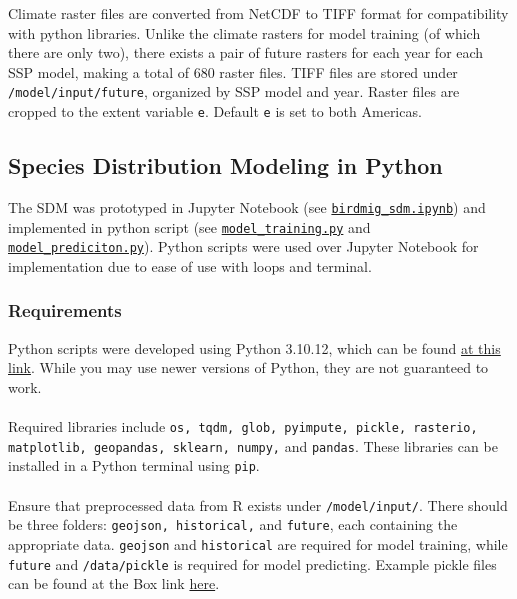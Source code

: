 \documentclass{article}
\begin{document}
Climate raster files are converted from NetCDF to TIFF format for compatibility with python libraries.
Unlike the climate rasters for model training (of which there are only two), there exists a pair of future rasters for each year for each SSP model, making a total of 680 raster files. 
TIFF files are stored under \texttt{/model/input/future}, organized by SSP model and year.
Raster files are cropped to the extent variable \texttt{e}. Default \texttt{e} is set to both Americas.

\subsection{Species Distribution Modeling in Python}

The SDM was prototyped in Jupyter Notebook (see \texttt{\href{run:../model/birdmig\_sdm.ipynb}{birdmig\_sdm.ipynb}}) and implemented in python script (see \texttt{\href{run:../model/model\_training.py}{model\_training.py}} and \texttt{\href{run:../model/model\_prediction.py}{model\_prediciton.py}}). Python scripts were used over Jupyter Notebook for implementation due to ease of use with loops and terminal.

\subsubsection*{Requirements}
Python scripts were developed using Python 3.10.12, which can be found \href{https://www.python.org/downloads/}{at this link}. While you may use newer versions of Python, they are not guaranteed to work.
\\\\
Required libraries include \texttt{os, tqdm, glob, pyimpute, pickle, rasterio, matplotlib, geopandas, sklearn, numpy,} and \texttt{pandas}. These libraries can be installed in a Python terminal using \texttt{pip}.
\\\\
Ensure that preprocessed data from R exists under \texttt{/model/input/}. There should be three folders: \texttt{geojson, historical,} and \texttt{future}, each containing the appropriate data. \texttt{geojson} and \texttt{historical} are required for model training, while \texttt{future} and \texttt{/data/pickle} is required for model predicting. Example pickle files can be found at the Box link \href{https://ucdavis.box.com/s/l5iky1y6z526r6ewifvtr6c4ccp5jsjz}{here}.
\end{document}

